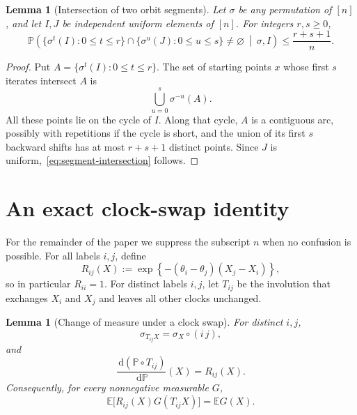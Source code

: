 \documentclass[11pt]{article}
\newcommand{\E}{\mathbb E}
\newcommand{\Pp}{\mathbb P}
\newcommand{\1}{\mathbf 1}
\newcommand{\dd}{\,\mathrm d}
\newtheorem{lemma}[theorem]{Lemma}
\theoremstyle{definition}
\theoremstyle{remark}
\begin{document}
\begin{lemma}[Intersection of two orbit segments]
\label{lem:segment-intersection}
Let $\sigma$ be any permutation of $[n]$, and let $I,J$ be independent
uniform elements of $[n]$.  For integers $r,s\geq0$,
\begin{equation}\label{eq:segment-intersection}
 \Pp\left(
 \{\sigma^t(I):0\leq t\leq r\}
 \cap
 \{\sigma^u(J):0\leq u\leq s\}\neq\varnothing
 \ \middle|\ \sigma,I
 \right)
 \leq \frac{r+s+1}{n}.
\end{equation}
\end{lemma}

\begin{proof}
Put $A=\{\sigma^t(I):0\leq t\leq r\}$.  The set of starting points $x$
whose first $s$ iterates intersect $A$ is
\[
  \bigcup_{u=0}^s\sigma^{-u}(A).
\]
All these points lie on the cycle of $I$.  Along that cycle, $A$ is a
contiguous arc, possibly with repetitions if the cycle is short, and the
union of its first $s$ backward shifts has at most $r+s+1$ distinct
points.  Since $J$ is uniform,~\eqref{eq:segment-intersection} follows.
\end{proof}

\section{An exact clock-swap identity}

For the remainder of the paper we suppress the subscript $n$ when no
confusion is possible.  For all labels $i,j$, define
\begin{equation}\label{eq:Rij-def}
  R_{ij}(X)
  :=\exp\!\left\{-(\theta_i-\theta_j)(X_j-X_i)\right\},
\end{equation}
so in particular $R_{ii}=1$.  For distinct labels $i,j$, let $T_{ij}$ be
the involution that exchanges $X_i$ and $X_j$ and leaves all other clocks
unchanged.

\begin{lemma}[Change of measure under a clock swap]
\label{lem:swap-rn}
For distinct $i,j$,
\begin{equation}\label{eq:perm-after-swap}
  \sigma_{T_{ij}X}=\sigma_X\circ(i\,j),
\end{equation}
and
\begin{equation}\label{eq:rn-swap}
  \frac{\dd(\Pp\circ T_{ij})}{\dd\Pp}(X)=R_{ij}(X).
\end{equation}
Consequently, for every nonnegative measurable $G$,
\begin{equation}\label{eq:swap-cov}
  \E\bigl[R_{ij}(X)G(T_{ij}X)\bigr]=\E G(X).
\end{equation}
\end{lemma}
\end{document}
